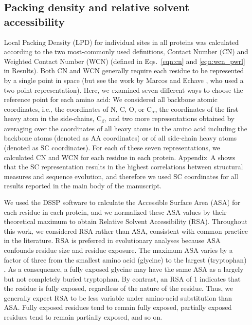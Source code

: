 \documentclass[12pt]{article}
\begin{document}
\subsection*{Packing density and relative solvent accessibility}

Local Packing Density (LPD) for individual sites in all proteins was calculated according to the two most-commonly used definitions, Contact Number (CN) and Weighted Contact Number (WCN) (defined in Eqs.~\ref{eqn:cn} and \ref{eqn:wcn_pwrl} in Results). Both CN and WCN generally require each residue to be represented by a single point in space
(but see the work by Marcos and Echave \cite{marcos_too_2015}, who used a two-point representation). Here, we examined seven different ways to choose the reference point for each amino acid: We considered all backbone atomic coordinates, i.e., the coordinates of N, C, O, or C{$_\alpha$}, the coordinates of the first heavy atom in the side-chains, C{$_\beta$}, and two more representations obtained by averaging over the coordinates of all heavy atoms in the amino acid including the backbone atoms (denoted as AA coordinates) or of all side-chain heavy atoms (denoted as SC coordinates). For each of these seven representations, we calculated CN and WCN for each residue in each protein. Appendix~A shows that the SC representation results in the highest correlations between structural measures and sequence evolution, and therefore we used SC coordinates for all results reported in the main body of the manuscript.

We used the DSSP software \cite{kabsch_dictionary_1983} to calculate  the Accessible Surface Area (ASA) for each residue in each protein, and we normalized these ASA values by their theoretical maximum \cite{tien_maximum_2013} to obtain Relative Solvent Accessibility (RSA). Throughout this work, we considered RSA rather than ASA, consistent with common practice in the literature. RSA is preferred in evolutionary analyses because ASA confounds residue size and residue exposure. The maximum ASA varies by a factor of three from the smallest amino acid (glycine) to the largest (tryptophan) \cite{tien_maximum_2013}. As a consequence, a fully exposed glycine may have the same ASA as a largely but not completely buried tryptophan. By contrast, an RSA of 1 indicates that the residue is fully exposed, regardless of the nature of the residue. Thus, we generally expect RSA to be less variable under amino-acid substitution than ASA. Fully exposed residues tend to remain fully exposed, partially exposed residues tend to remain partially exposed, and so on.
\end{document}
